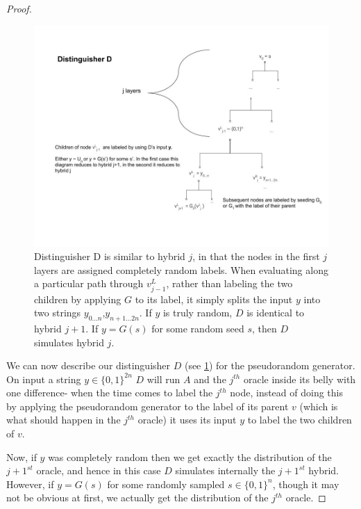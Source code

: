 \begin{proof}
\begin{figure}
\centering
\includegraphics[width=\textwidth, height=0.25\paperheight, keepaspectratio]{../figure/distinguisher_D_thm_5-1.jpg}
\caption{Distinguisher D is similar to hybrid \(j\), in that the nodes
in the first \(j\) layers are assigned completely random labels. When
evaluating along a particular path through \(v_{j-1}^{L}\), rather than
labeling the two children by applying \(G\) to its label, it simply
splits the input \(y\) into two strings \(y_{0...n}\),\(y_{n+1...2n}\).
If \(y\) is truly random, \(D\) is identical to hybrid \(j+1\). If
\(y=G(s)\) for some random seed \(s\), then \(D\) simulates hybrid
\(j\).}
\label{distinguisherd}
\end{figure}

We can now describe our distinguisher \(D\) (see \cref{distinguisherd})
for the pseudorandom generator. On input a string \(y\in\{0,1\}^{2n}\)
\(D\) will run \(A\) and the \(j^{th}\) oracle inside its belly with one
difference- when the time comes to label the \(j^{th}\) node, instead of
doing this by applying the pseudorandom generator to the label of its
parent \(v\) (which is what should happen in the \(j^{th}\) oracle) it
uses its input \(y\) to label the two children of \(v\).

Now, if \(y\) was completely random then we get exactly the distribution
of the \(j+1^{st}\) oracle, and hence in this case \(D\) simulates
internally the \(j+1^{st}\) hybrid. However, if \(y=G(s)\) for some
randomly sampled \(s\in\{0,1\}^n\), though it may not be obvious at
first, we actually get the distribution of the \(j^{th}\) oracle.


\end{proof}
